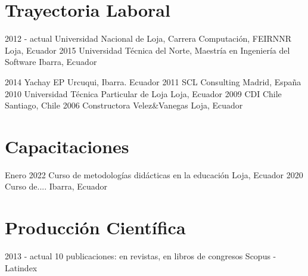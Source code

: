 \documentclass[]{cv-style} %
\begin{document}
\section{Trayectoria Laboral}
\vspace{-0.3cm}
\begin{entrylist}
\small
\entry
  {2012 - actual}
  {Universidad Nacional de Loja, Carrera Computación, FEIRNNR}
  {Loja, Ecuador}
  { }
\entry
  {2015}
  {Universidad Técnica del Norte, Maestría en Ingeniería del Software}
  {Ibarra, Ecuador}
  { }

\entry
  {2014}
  {Yachay EP}
  {Urcuqui, Ibarra. Ecuador}
  { }
\entry
  {2011}
  {SCL Consulting}
  {Madrid, España}
  { }
 \entry
  {2010}
  {Universidad Técnica Particular de Loja}
  {Loja, Ecuador}
  { }
 \entry
  {2009}
  {CDI Chile}
  {Santiago, Chile}
  { }
\entry
  {2006}
  {Constructora Velez\&Vanegas }
  {Loja, Ecuador}
  { }
\end{entrylist}

\section{Capacitaciones}
\vspace{-0.3cm}
\begin{entrylist}
\small
\entry
  {Enero 2022}
  {Curso de metodologías didácticas en la educación}
  {Loja, Ecuador}
  { }
\entry
  {2020}
  {Curso de....}
  {Ibarra, Ecuador}
  { }

\end{entrylist}

\section{Producción Científica} %
\vspace{-0.3cm}

\begin{entrylist}
\entry
    {2013 - actual}
    {10 publicaciones: {} en revistas, {} en libros de congresos}
    {Scopus - Latindex}
    {
}
\end{entrylist} 

\nocite{9582635} \nocite{CalderonOrdonez}
\nocite{Cumbicus-Pineda2019}\nocite{MallaSanchez}\nocite{DarwinGualotuna}\nocite{Ordonez-Ordonez2019}\nocite{Ordonez-Ordonez2019a}\nocite{Ordonez-Ordonez2020}\nocite{pineda2014identificacion}\nocite{RivasEcheverria}

 
\end{document}
